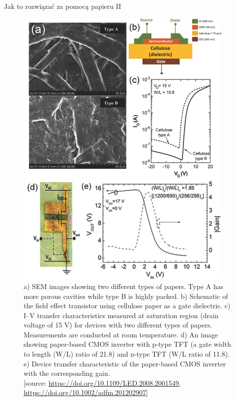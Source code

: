 \documentclass{beamer}
\begin{document}
\begin{frame}{Jak to rozwiązać za pomocą papieru II }
    \begin{figure}
        \centering
        \begin{columns}
        \begin{column}{0.5\textwidth}
        \includegraphics[width=\textwidth]{fig5.jpg}
        \end{column}
        \begin{column}{0.45\textwidth}
        \caption{a) SEM images showing two different types of papers. Type A has more porous cavities while type B is highly packed. b) Schematic of the field effect transistor using cellulose paper as a gate dielectric. c) I–V transfer characteristics measured at saturation region (drain voltage of 15 V) for devices with two different types of papers. Measurements are conducted at room temperature. d) An image showing paper-based CMOS inverter with p-type TFT (a gate width to length (W/L) ratio of 21.8) and n-type TFT (W/L ratio of 11.8). e) Device transfer characteristic of the paper-based CMOS inverter with the corresponding gain.\\ \typeout{}
        [source: \url{https://doi.org/10.1109/LED.2008.2001549}, \url{https://doi.org/10.1002/adfm.201202907}]}
                \end{column}
        \end{columns}
    \end{figure}
\end{frame}
\end{document}
